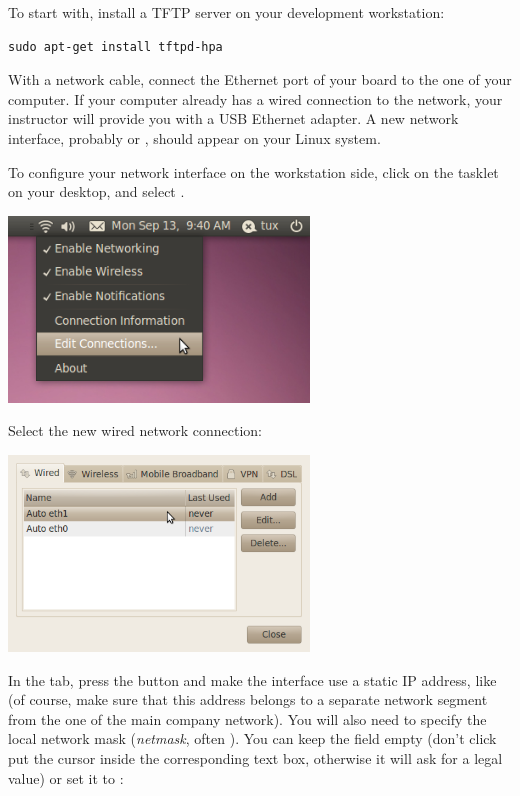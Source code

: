 To start with, install a TFTP server on your development workstation:

\begin{verbatim}
sudo apt-get install tftpd-hpa
\end{verbatim}

With a network cable, connect the Ethernet port of your board to the
one of your computer. If your computer already has a wired connection
to the network, your instructor will provide you with a USB Ethernet
adapter. A new network interface, probably  or ,
should appear on your Linux system.

To configure your network interface on the workstation side, click on
the  tasklet on your desktop, and select
.

\begin{center}
\includegraphics[width=8cm]{labs/kernel-board-setup/network-config-1.png}
\end{center}

Select the new wired network connection:

\begin{center}
\includegraphics[width=8cm]{labs/kernel-board-setup/network-config-2.png}
\end{center}

In the  tab, press the  button and
make the interface use a static IP
address, like  (of course, make sure that this address
belongs to a separate network segment from the one of the main company
network). You will also need to specify the local network mask
(\emph{netmask}, often ). You can keep the
 field empty (don't click put the cursor inside the
corresponding text box, otherwise it will ask for a legal value)
or set it to :

